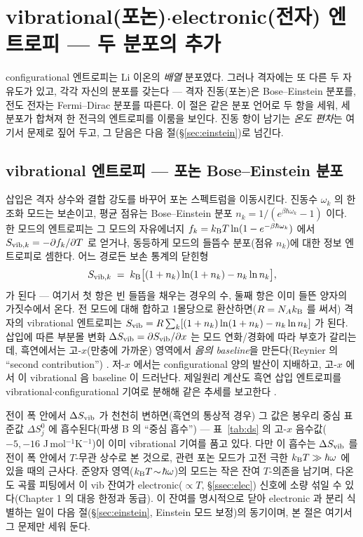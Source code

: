 \section{vibrational(포논)$\cdot$electronic(전자) 엔트로피 --- 두 분포의 추가}\label{sec:vibel}

configurational 엔트로피는 Li 이온의 \emph{배열} 분포였다. 그러나 격자에는 또 다른 두 자유도가 있고, 각각
자신의 분포를 갖는다 --- 격자 진동(포논)은 Bose--Einstein 분포를, 전도 전자는 Fermi--Dirac 분포를 따른다.
이 절은 같은 분포 언어로 두 항을 세워, 세 분포가 합쳐져 한 전극의 엔트로피를 이룸을 보인다. 진동 항이
남기는 \emph{온도 편차}는 여기서 문제로 짚어 두고, 그 닫음은 다음 절(\S\ref{sec:einstein})로 넘긴다.

\subsection{vibrational 엔트로피 --- 포논 Bose--Einstein 분포}\label{ssec:vib}
삽입은 격자 상수와 결합 강도를 바꾸어 포논 스펙트럼을 이동시킨다. 진동수 $\omega_k$ 의 한 조화 모드는
보손이고, 평균 점유는 Bose--Einstein 분포 $n_k=1/(e^{\beta\hbar\omega_k}-1)$ 이다. 한 모드의 엔트로피는 그
모드의 자유에너지 $f_k=k_{\mathrm B} T\ln(1-e^{-\beta\hbar\omega_k})$ 에서 $S_{\mathrm{vib},k}=-\partial f_k/\partial T$ 로 얻거나,
동등하게 모드의 들뜸수 분포(점유 $n_k$)에 대한 정보 엔트로피로 셈한다. 어느 경로든 보손 통계의 닫힌형
\begin{equation}
S_{\mathrm{vib},k} \;=\; k_{\mathrm B}\bigl[(1+n_k)\ln(1+n_k) - n_k\ln n_k\bigr],
\label{eq:Svib_mode}
\end{equation}
가 된다 --- 여기서 첫 항은 빈 들뜸을 채우는 경우의 수, 둘째 항은 이미 들뜬 양자의 가짓수에서 온다. 전
모드에 대해 합하고 1몰당으로 환산하면($R=N_Ak_{\mathrm B}$ 를 써서) 격자의 vibrational 엔트로피는
$S_{\mathrm{vib}}=R\sum_k[(1+n_k)\ln(1+n_k)-n_k\ln n_k]$ 가 된다. 삽입에 따른 부분몰 변화 $\Delta S_{\mathrm{vib}}=\partial
S_{\mathrm{vib}}/\partial x$ 는 모드 연화/경화에 따라 부호가 갈리는데, 흑연에서는 고-$x$(만충에 가까운) 영역에서
\emph{음의 baseline}을 만든다(Reynier 의 ``second contribution'') \cite{reynier2003}. 저-$x$ 에서는
configurational 양의 발산이 지배하고, 고-$x$ 에서 이 vibrational 음 baseline 이 드러난다. 제일원리 계산도
흑연 삽입 엔트로피를 vibrational$\cdot$configurational 기여로 분해해 같은 추세를 보고한다 \cite{jpcc2021}.

전이 폭 안에서 $\Delta S_{\mathrm{vib}}$ 가 천천히 변하면(흑연의 통상적 경우) 그 값은 봉우리 중심 표준값 $\Delta S^0_j$
에 흡수된다(파생 B 의 ``중심 흡수'') --- 표~\ref{tab:ds} 의 고-$x$ 음수값($-5,-16$ J\,mol$^{-1}$K$^{-1}$)이
이미 vibrational 기여를 품고 있다. 다만 이 흡수는 $\Delta S_{\mathrm{vib}}$ 를 전이 폭 안에서 $T$-무관 상수로 본 것으로,
관련 포논 모드가 고전 극한 $k_{\mathrm B} T\gg\hbar\omega$ 에 있을 때의 근사다. 준양자 영역($k_{\mathrm B} T\!\sim\!\hbar\omega$)의
모드는 작은 잔여 $T$-의존을 남기며, 다온도 곡률 피팅에서 이 vib 잔여가 electronic($\propto T$,
\S\ref{ssec:elec}) 신호에 소량 섞일 수 있다(Chapter 1 의 대응 한정과 동급). 이 잔여를 명시적으로 닫아
electronic 과 분리 식별하는 일이 다음 절(\S\ref{sec:einstein}, Einstein 모드 보정)의 동기이며, 본 절은 여기서
그 문제만 세워 둔다.


